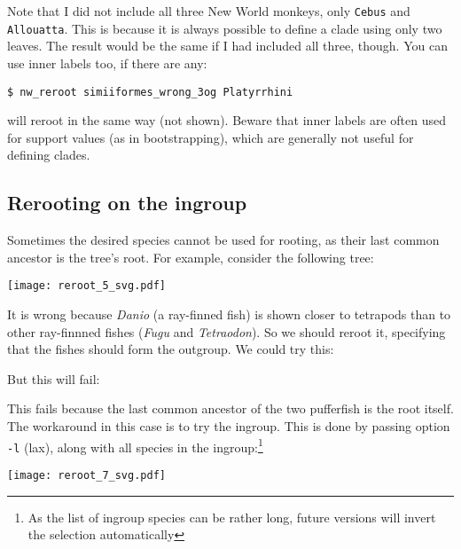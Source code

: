 \noindent{}Note that I did not include all three New World monkeys, only \texttt{Cebus} and \texttt{Allouatta}. This is because it is always possible to define a clade using only two leaves. The result would be the same if I had included all three, though. You can use inner labels too, if there are any:
\begin{verbatim}
$ nw_reroot simiiformes_wrong_3og Platyrrhini
\end{verbatim}
will reroot in the same way (not shown). Beware that inner labels are often
used for support values (as in bootstrapping), which are generally not useful
for defining clades.

\subsection{Rerooting on the ingroup}

Sometimes the desired species cannot be used for rooting, as their last common ancestor is the tree's root. For example, consider the following tree:

\texttt{[image: reroot\_5\_svg.pdf]}

\noindent{}It is wrong because \textit{Danio} (a ray-finned fish) is shown closer to tetrapods than to other ray-finnned fishes (\textit{Fugu} and \textit{Tetraodon}). So we should reroot it, specifying that the fishes should form the outgroup. We could try this:



\noindent{}But this will fail:



\noindent{}This fails because the last common ancestor of the two pufferfish is the root itself. The workaround in this case is to try the ingroup. This is done by passing option \texttt{-l} (lax), along with all species in the ingroup:\footnote{As the list of ingroup species can be rather long, future versions will invert the selection automatically}


\texttt{[image: reroot\_7\_svg.pdf]}
